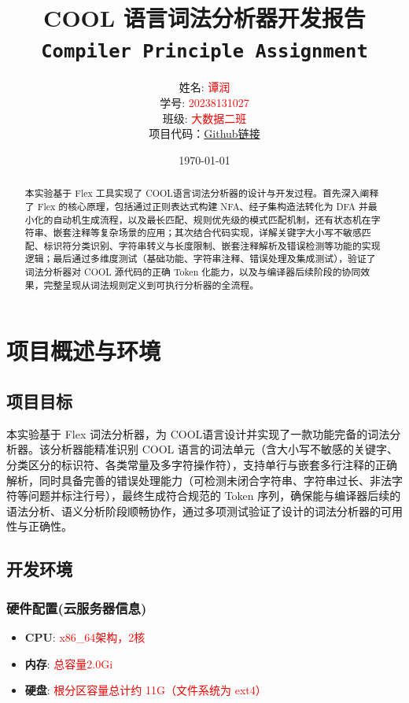 \documentclass[twocolumn]{article}
\title{
    \vspace{-1cm} %
    \textbf{COOL 语言词法分析器开发报告} \\
    \large \texttt{Compiler Principle Assignment}
}
\author{
    姓名: \textcolor{red}{谭润} \\
    学号: \textcolor{red}{20238131027} \\
    班级: \textcolor{red}{大数据二班} \\
    项目代码：\href{https://github.com/tanrun0/school_homework_code/tree/main/compiler/shiyan2}{Github链接}
}
\date{\today}
\begin{document}
\maketitle
\thispagestyle{fancy} %

\begin{abstract}
\noindent
本实验基于 Flex 工具实现了 COOL语言词法分析器的设计与开发过程。首先深入阐释了 Flex 的核心原理，包括通过正则表达式构建 NFA、经子集构造法转化为 DFA 并最小化的自动机生成流程，以及最长匹配、规则优先级的模式匹配机制，还有状态机在字符串、嵌套注释等复杂场景的应用；其次结合代码实现，详解关键字大小写不敏感匹配、标识符分类识别、字符串转义与长度限制、嵌套注释解析及错误检测等功能的实现逻辑；最后通过多维度测试（基础功能、字符串注释、错误处理及集成测试），验证了词法分析器对 COOL 源代码的正确 Token 化能力，以及与编译器后续阶段的协同效果，完整呈现从词法规则定义到可执行分析器的全流程。
\end{abstract}

\section{项目概述与环境}
\subsection{项目目标}
本实验基于 Flex 词法分析器，为 COOL语言设计并实现了一款功能完备的词法分析器。该分析器能精准识别 COOL 语言的词法单元（含大小写不敏感的关键字、分类区分的标识符、各类常量及多字符操作符），支持单行与嵌套多行注释的正确解析，同时具备完善的错误处理能力（可检测未闭合字符串、字符串过长、非法字符等问题并标注行号），最终生成符合规范的 Token 序列，确保能与编译器后续的语法分析、语义分析阶段顺畅协作，通过多项测试验证了设计的词法分析器的可用性与正确性。
\subsection{开发环境}

\subsubsection{硬件配置(云服务器信息)}
\begin{itemize}
    \item \textbf{CPU}: \textcolor{red}{x86\_64架构，2核}
    \item \textbf{内存}: \textcolor{red}{总容量2.0Gi}
    \item \textbf{硬盘}: \textcolor{red}{根分区容量总计约 11G（文件系统为 ext4）}
\end{itemize}
\end{document}
